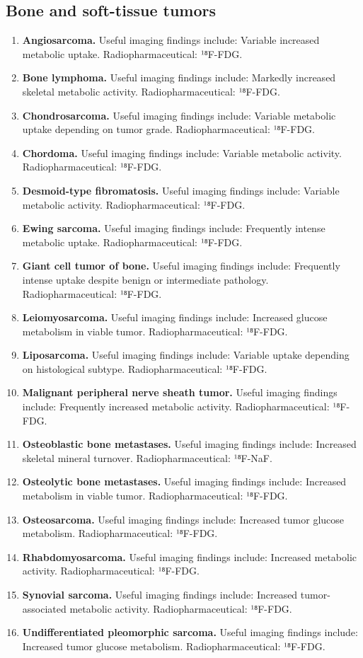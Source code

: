 \subsection{Bone and soft-tissue tumors}
\begin{enumerate}[leftmargin=*,itemsep=0.45em,topsep=0.4em]
\item \textbf{Angiosarcoma.} Useful imaging findings include: Variable increased metabolic uptake. Radiopharmaceutical: ¹⁸F-FDG.
\item \textbf{Bone lymphoma.} Useful imaging findings include: Markedly increased skeletal metabolic activity. Radiopharmaceutical: ¹⁸F-FDG.
\item \textbf{Chondrosarcoma.} Useful imaging findings include: Variable metabolic uptake depending on tumor grade. Radiopharmaceutical: ¹⁸F-FDG.
\item \textbf{Chordoma.} Useful imaging findings include: Variable metabolic activity. Radiopharmaceutical: ¹⁸F-FDG.
\item \textbf{Desmoid-type fibromatosis.} Useful imaging findings include: Variable metabolic activity. Radiopharmaceutical: ¹⁸F-FDG.
\item \textbf{Ewing sarcoma.} Useful imaging findings include: Frequently intense metabolic uptake. Radiopharmaceutical: ¹⁸F-FDG.
\item \textbf{Giant cell tumor of bone.} Useful imaging findings include: Frequently intense uptake despite benign or intermediate pathology. Radiopharmaceutical: ¹⁸F-FDG.
\item \textbf{Leiomyosarcoma.} Useful imaging findings include: Increased glucose metabolism in viable tumor. Radiopharmaceutical: ¹⁸F-FDG.
\item \textbf{Liposarcoma.} Useful imaging findings include: Variable uptake depending on histological subtype. Radiopharmaceutical: ¹⁸F-FDG.
\item \textbf{Malignant peripheral nerve sheath tumor.} Useful imaging findings include: Frequently increased metabolic activity. Radiopharmaceutical: ¹⁸F-FDG.
\item \textbf{Osteoblastic bone metastases.} Useful imaging findings include: Increased skeletal mineral turnover. Radiopharmaceutical: ¹⁸F-NaF.
\item \textbf{Osteolytic bone metastases.} Useful imaging findings include: Increased metabolism in viable tumor. Radiopharmaceutical: ¹⁸F-FDG.
\item \textbf{Osteosarcoma.} Useful imaging findings include: Increased tumor glucose metabolism. Radiopharmaceutical: ¹⁸F-FDG.
\item \textbf{Rhabdomyosarcoma.} Useful imaging findings include: Increased metabolic activity. Radiopharmaceutical: ¹⁸F-FDG.
\item \textbf{Synovial sarcoma.} Useful imaging findings include: Increased tumor-associated metabolic activity. Radiopharmaceutical: ¹⁸F-FDG.
\item \textbf{Undifferentiated pleomorphic sarcoma.} Useful imaging findings include: Increased tumor glucose metabolism. Radiopharmaceutical: ¹⁸F-FDG.
\end{enumerate}

